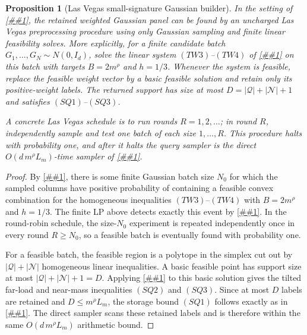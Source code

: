 \documentclass[10pt]{article}
\newcommand{\cref}[1]{\ref{##1}}
\newtheorem{proposition}[theorem]{Proposition}
\theoremstyle{definition}
\begin{document}
\begin{proposition}[Las Vegas small-signature Gaussian builder]
   \label{prop:las-vegas-small-signature-gaussian}
   In the setting of
   \cref{cor:small-signature-gaussian-quadrature}, the retained weighted
   Gaussian panel can be found by an uncharged Las Vegas preprocessing
   procedure using only Gaussian sampling and finite linear feasibility solves.
   More explicitly, for a finite candidate batch
   \(G_1,\ldots,G_N\sim N(0,I_d)\), solve the linear system
   \((TW3)\)--\((TW4)\) of
   \cref{lem:tilted-weight-linear-feasibility} on this batch with targets
   \(B=2m^\rho\) and \(h=1/3\).  Whenever the system is feasible, replace the
   feasible weight vector by a basic feasible solution and retain only its
   positive-weight labels.  The returned support has size at most
   \(D=|\mathcal Q|+|\mathcal N|+1\) and satisfies \((SQ1)\)--\((SQ3)\).

   A concrete Las Vegas schedule is to run rounds \(R=1,2,\ldots\); in round
   \(R\), independently sample and test one batch of each size
   \(1,\ldots,R\).  This procedure halts with probability one, and after it
   halts the query sampler is the direct \(O(d\,m^\rho L_m)\)-time sampler of
   \cref{cor:small-signature-gaussian-quadrature}.
\end{proposition}

\begin{proof}
   By \cref{lem:continuous-gaussian-finite-witness}, there is some finite
   Gaussian batch size \(N_0\) for which the sampled columns have positive
   probability of containing a feasible convex combination for the homogeneous
   inequalities \((TW3)\)--\((TW4)\) with \(B=2m^\rho\) and \(h=1/3\).  The
   finite LP above detects exactly this event by
   \cref{lem:tilted-weight-linear-feasibility}.  In the round-robin schedule,
   the size-\(N_0\) experiment is repeated independently once in every round
   \(R\ge N_0\), so a feasible batch is eventually found with probability one.

   For a feasible batch, the feasible region is a polytope in the simplex cut
   out by \(|\mathcal Q|+|\mathcal N|\) homogeneous linear inequalities.  A
   basic feasible point has support size at most
   \(|\mathcal Q|+|\mathcal N|+1=D\).  Applying
   \cref{lem:tilted-weight-linear-feasibility} to this basic solution gives
   the tilted far-load and near-mass inequalities \((SQ2)\) and \((SQ3)\).
   Since at most \(D\) labels are retained and \(D\le m^\rho L_m\), the
   storage bound \((SQ1)\) follows exactly as in
   \cref{cor:small-signature-gaussian-quadrature}.  The direct sampler scans
   these retained labels and is therefore within the same
   \(O(d\,m^\rho L_m)\) arithmetic bound.
\end{proof}
\end{document}
